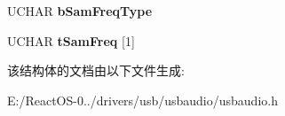 \begin{DoxyCompactItemize}
\item 
\mbox{\label{struct_u_s_b___a_u_d_i_o___s_t_r_e_a_m_i_n_g___f_o_r_m_a_t___t_y_p_e___d_e_s_c_r_i_p_t_o_r_a84405d30b7ae8162186140651473fba7}} 
U\+C\+H\+AR {\bfseries b\+Sam\+Freq\+Type}
\item 
\mbox{\label{struct_u_s_b___a_u_d_i_o___s_t_r_e_a_m_i_n_g___f_o_r_m_a_t___t_y_p_e___d_e_s_c_r_i_p_t_o_r_a8ba00eb0c3060de7be80d0a7cf0ed93b}} 
U\+C\+H\+AR {\bfseries t\+Sam\+Freq} \mbox{[}1\mbox{]}
\end{DoxyCompactItemize}


该结构体的文档由以下文件生成\+:\begin{DoxyCompactItemize}
\item 
E\+:/\+React\+O\+S-\/0../drivers/usb/usbaudio/usbaudio.\+h\end{DoxyCompactItemize}
